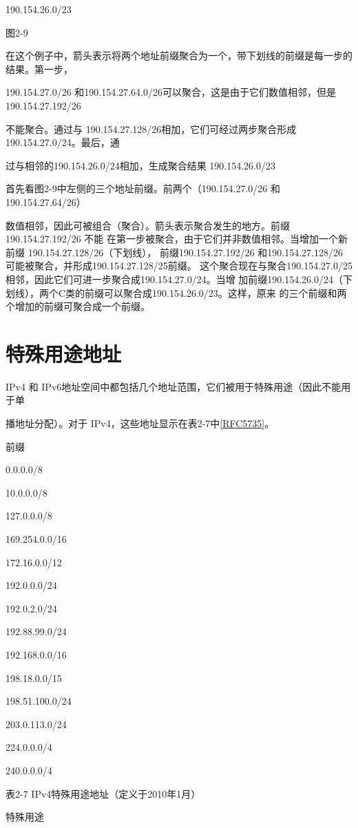 190.154.26.0/23

图2-9

在这个例子中，箭头表示将两个地址前缀聚合为一个，带下划线的前缀是每一步的结果。第一步，

190.154.27.0/26 和190.154.27.64.0/26可以聚合，这是由于它们数值相邻，但是190.154.27.192/26

不能聚合。通过与 190.154.27.128/26相加，它们可经过两步聚合形成 190.154.27.0/24。最后，通

过与相邻的190.154.26.0/24相加，生成聚合结果 190.154.26.0/23

首先看图2-9中左侧的三个地址前缀。前两个（190.154.27.0/26 和 190.154.27.64/26）

数值相邻，因此可被组合（聚合）。箭头表示聚合发生的地方。前缀190.154.27.192/26 不能
在第一步被聚合，由于它们并非数值相邻。当增加一个新前缀 190.154.27.128/26（下划线），
前缀190.154.27.192/26 和190.154.27.128/26 可能被聚合，并形成190.154.27.128/25前缀。
这个聚合现在与聚合190.154.27.0/25相邻，因此它们可进一步聚合成190.154.27.0/24。当增
加前缀190.154.26.0/24（下划线），两个C类的前缀可以聚合成190.154.26.0/23。这样，原来
的三个前缀和两个增加的前缀可聚合成一个前缀。

\section{特殊用途地址}
IPv4 和 IPv6地址空间中都包括几个地址范围，它们被用于特殊用途（因此不能用于单

播地址分配）。对于 IPv4，这些地址显示在表2-7中\href{https://www.rfc-editor.org/rfc/rfc5735}{[RFC5735]}。

前缀

0.0.0.0/8

10.0.0.0/8

127.0.0.0/8

169.254.0.0/16

172.16.0.0/12

192.0.0.0/24

192.0.2.0/24

192.88.99.0/24

192.168.0.0/16

198.18.0.0/15

198.51.100.0/24

203.0.113.0/24

224.0.0.0/4

240.0.0.0/4

表2-7 IPv4特殊用途地址（定义于2010年1月）

特殊用途

